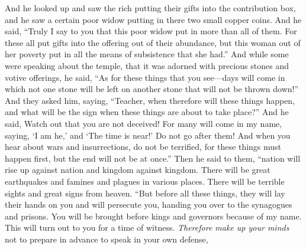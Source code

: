 \begin{biblechapter} %
 And he looked up and saw the rich putting their gifts into the contribution box,
\verse and he saw a certain poor widow putting in there two small copper coins.
\verse And he said, “Truly I say to you that this poor widow put in more than all of them.
\verse For these all put gifts into the offering out of their abundance, but this woman out of her poverty put in all the means of subsistence that she had.”
 And while some were speaking about the temple, that it was adorned with precious stones and votive offerings, he said,
\verse “As for these things that you see—days will come in which not one stone will be left on another stone that will not be thrown down!”
 And they asked him, saying, “Teacher, when therefore will these things happen, and what will be the sign when these things are about to take place?”
\verse And he said, Watch out that you are not deceived! For many will come in my name, saying, ‘I am he,’ and ‘The time is near!’ Do not go after them!
\verse And when you hear about wars and insurrections, do not be terrified, for these things must happen first, but the end will not be at once.”
\verse Then he said to them, “nation will rise up against nation and kingdom against kingdom.
\verse There will be great earthquakes and famines and plagues in various places. There will be terrible sights and great signs from heaven.
 “But before all these things, they will lay their hands on you and will persecute you, handing you over to the synagogues and prisons. You will be brought before kings and governors because of my name.
\verse This will turn out to you for a time of witness.
\verse \textit{Therefore make up your minds} not to prepare in advance to speak in your own defense,

\end{biblechapter}
